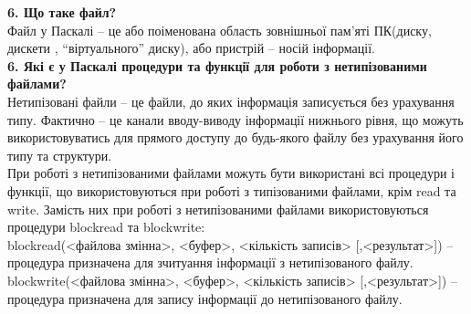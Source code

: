 \documentclass[14pt,a4paper]{scrartcl}
\begin{document}
\textbf{6. Що таке файл?}\\

Файл у Паскалі – це або поіменована область зовнішньої пам’яті
ПК(диску, дискети , “віртуального” диску), або пристрій – носій інформації.\\

\textbf{6. Які є у Паскалі процедури та функції для роботи з нетипізованими файлами?}\\

Нетипізовані файли – це файли, до яких інформація записується без урахування типу. Фактично – це канали вводу-виводу інформації нижнього рівня, що можуть використовуватись для прямого доступу до будь-якого файлу без урахування його типу та структури.\\

При роботі з нетипізованими файлами можуть бути використані всі
процедури і функції, що використовуються при роботі з типізованими файлами,
крім read та write. Замість них при роботі з нетипізованими файлами
використовуються процедури blockread та blockwrite:\\
blockread(<файлова змінна>, <буфер>, <кількість записів> [,<результат>]) –
процедура призначена для зчитуання інформації з нетипізованого файлу.\\
blockwrite(<файлова змінна>, <буфер>, <кількість записів> [,<результат>]) –
процедура призначена для запису інформації до нетипізованого файлу.\\
\end{document}
